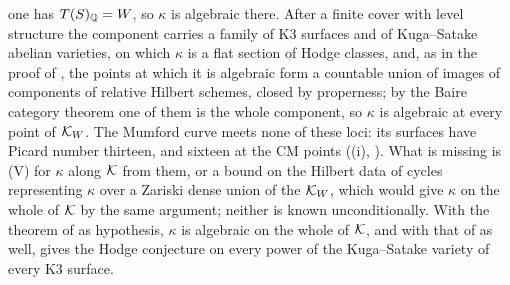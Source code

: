 \begin{remark}
one has $T(S)_{\mathbb{Q}}=W$, so $\kappa$ is algebraic there. After a finite cover
with level structure the component carries a family of K3 surfaces and of
Kuga--Satake abelian varieties, on which $\kappa$ is a flat section of Hodge
classes, and, as in the proof of , the points at which it
is algebraic form a countable union of images of components of relative
Hilbert schemes, closed by properness; by the Baire category theorem one of
them is the whole component, so $\kappa$ is algebraic at every point of
$\mathcal{K}_{W}$. The Mumford curve meets none of these loci: its surfaces have
Picard number thirteen, and sixteen at the CM points
((i), ). What is missing is
\textup{(V)} for $\kappa$ along $\mathcal{K}$ from them, or a bound on the Hilbert data
of cycles representing $\kappa$ over a Zariski dense union of the $\mathcal{K}_{W}$,
which would give $\kappa$ on the whole of $\mathcal{K}$ by the same argument; neither
is known unconditionally. With the theorem of \cite{OAI26c} as hypothesis,
$\kappa$ is algebraic on the whole of $\mathcal{K}$, and with that of
\cite{OAI26f} as well,  gives the Hodge conjecture on
every power of the Kuga--Satake variety of every K3 surface.
\end{remark}
